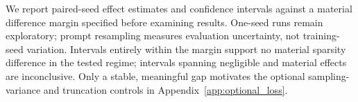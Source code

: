 We report paired-seed effect estimates and confidence intervals against
a material difference margin specified before examining results.
One-seed runs remain exploratory; prompt resampling measures evaluation
uncertainty, not training-seed variation. Intervals entirely within the
margin support no material sparsity difference in the tested regime;
intervals spanning negligible and material effects are inconclusive.
Only a stable, meaningful gap motivates
the optional sampling-variance and truncation controls in
Appendix~\ref{app:optional_loss}.

